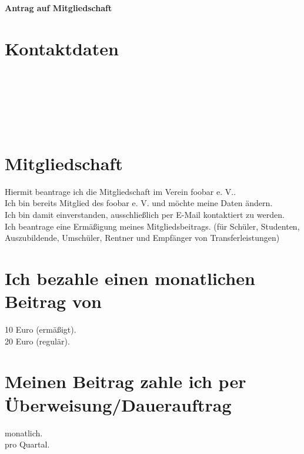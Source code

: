 

\pagestyle{empty}

\begin{Form}
\noindent\textbf{\Huge Antrag auf Mitgliedschaft}\\
\section*{Kontaktdaten}
\\[3mm]
\\[3mm]
\\[3mm]
\\[3mm]
\\[3mm]

\section*{Mitgliedschaft}
\CheckBox[name=1,bordercolor=black]{} Hiermit beantrage ich die Mitgliedschaft im Verein foobar e. V..\\[1mm]
\CheckBox[name=2,bordercolor=black]{} Ich bin bereits Mitglied des foobar e. V. und möchte meine Daten ändern.\\[1mm]
\CheckBox[name=3,bordercolor=black]{} Ich bin damit einverstanden, ausschließlich per E-Mail kontaktiert zu werden.\\[1mm]
\CheckBox[name=4,bordercolor=black]{} Ich beantrage eine Ermäßigung meines Mitgliedsbeitrags. (für Schüler, Studenten, Auszubildende, Umschüler, Rentner und Empfänger von Transferleistungen)

\section*{Ich bezahle einen monatlichen Beitrag von}
\CheckBox[name=5,bordercolor=black]{} 10 Euro (ermäßigt). 
\tab{\CheckBox[name=6,bordercolor=black]{} \noindent\rule{5cm}{0.4pt}}\\[3mm]
\CheckBox[name=7,bordercolor=black]{} 20 Euro (regulär).
\section*{Meinen Beitrag zahle ich per Überweisung/Dauerauftrag}
\CheckBox[name=8,bordercolor=black]{} monatlich.
\\[3mm]
\CheckBox[name=10,bordercolor=black]{} pro Quartal.
\\


\end{Form}
